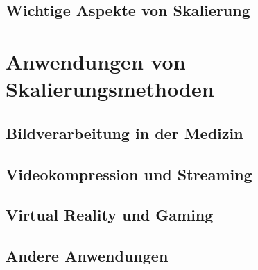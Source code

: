 \subsection{Wichtige Aspekte von Skalierung}


\section{Anwendungen von Skalierungsmethoden}

\subsection{Bildverarbeitung in der Medizin}

\subsection{Videokompression und Streaming}

\subsection{Virtual Reality und Gaming}

\subsection{Andere Anwendungen}
